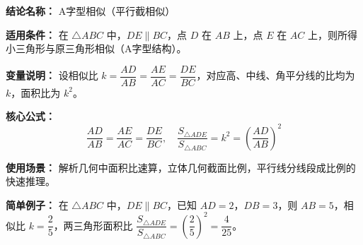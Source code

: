\textbf{结论名称：} A字型相似（平行截相似）

\textbf{适用条件：} 在 $\triangle ABC$ 中，$DE \parallel BC$，点 $D$ 在 $AB$ 上，点 $E$ 在 $AC$ 上，则所得小三角形与原三角形相似（A字型结构）。

\textbf{变量说明：} 设相似比 $k = \dfrac{AD}{AB} = \dfrac{AE}{AC} = \dfrac{DE}{BC}$，对应高、中线、角平分线的比均为 $k$，面积比为 $k^2$。

\textbf{核心公式：} 
\[
\boxed{\frac{AD}{AB} = \frac{AE}{AC} = \frac{DE}{BC}, \quad \frac{S_{\triangle ADE}}{S_{\triangle ABC}} = k^2 = \left(\frac{AD}{AB}\right)^2}
\]

\textbf{使用场景：} 解析几何中面积比速算，立体几何截面比例，平行线分线段成比例的快速推理。

\textbf{简单例子：} 在 $\triangle ABC$ 中，$DE \parallel BC$，已知 $AD = 2$，$DB = 3$，则 $AB = 5$，相似比 $k = \dfrac{2}{5}$，两三角形面积比 $\dfrac{S_{\triangle ADE}}{S_{\triangle ABC}} = \left(\dfrac{2}{5}\right)^2 = \dfrac{4}{25}$。
